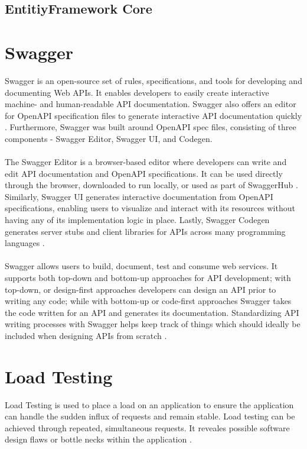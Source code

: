 \documentclass[BIF,Bachelor,nenglish]{twbook}%
\begin{document}
\subsection{EntitiyFramework Core}

\section{Swagger}
Swagger is an open-source set of rules, specifications, and tools for developing and documenting Web \ac{API}s. It enables developers to easily create interactive machine- and human-readable \ac{API} documentation. Swagger also offers an editor for OpenAPI specification files to generate interactive \ac{API} documentation quickly \cite{javapoint}. Furthermore, Swagger was built around OpenAPI spec files, consisting of three components - Swagger Editor, Swagger UI, and Codegen.
\\
\\
The Swagger Editor is a browser-based editor where developers can write and edit \ac{API} documentation and OpenAPI specifications. It can be used directly through the browser, downloaded to run locally, or used as part of SwaggerHub \cite{hubspot}. Similarly, Swagger UI generates interactive documentation from OpenAPI specifications, enabling users to visualize and interact with its resources without having any of its implementation logic in place. Lastly, Swagger Codegen generates server stubs and client libraries for \ac{API}s across many programming languages \cite{swagger}.
\\
\\
Swagger allows users to build, document, test and consume web services. It supports both top-down and bottom-up approaches for \ac{API} development; with top-down, or design-first approaches developers can design an \ac{API} prior to writing any code; while with bottom-up or code-first approaches Swagger takes the code written for an \ac{API} and generates its documentation. Standardizing \ac{API} writing processes with Swagger helps keep track of things which should ideally be included when designing \ac{API}s from scratch \cite{scaleyourapp}.

\section{Load Testing}
Load Testing is used to place a load on an application to ensure the application can handle the sudden influx of requests and remain stable. Load testing can be achieved through repeated, simultaneous requests. It reveales possible software design flaws or bottle necks within the application \cite{loadtest}.
\end{document}
